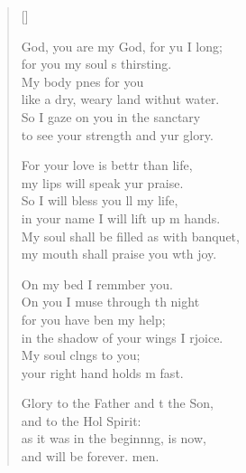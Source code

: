 \settowidth{\versewidth}{My soul shall be filled as with a banquet, *}
\begin{verse}[\versewidth]
  \begin{patverse}
     God, you are my God, for yu I long;\Med\\
for you my soul \pointup{\i}s thirsting.\\
My body p\pointup{\i}nes for you\Med\\
like a dry, weary land withut water.\\
So I gaze on you in the sanctary\Med\\
to see your strength and yur glory.

For your love is bettr than life,\Med\\
my lips will speak yur praise.\\
So I will bless you ll my life,\Med\\
in your name I will lift up m hands.\\
My soul shall be filled as with  banquet,\Med\\
my mouth shall praise you w\pointup{\i}th joy.

On my bed I remmber you.\Med\\
On you I muse through th night\\
for you have ben my help;\Med\\
in the shadow of your wings I rjoice.\\
My soul cl\pointup{\i}ngs to you;\Med\\
your right hand holds m fast.

Glory to the Father and t the Son,\Med\\
and to the Hol Spirit:\\
as it was in the beginn\pointup{\i}ng, is now,\Med\\
and will be forever. men.
  \end{patverse}
\end{verse}
